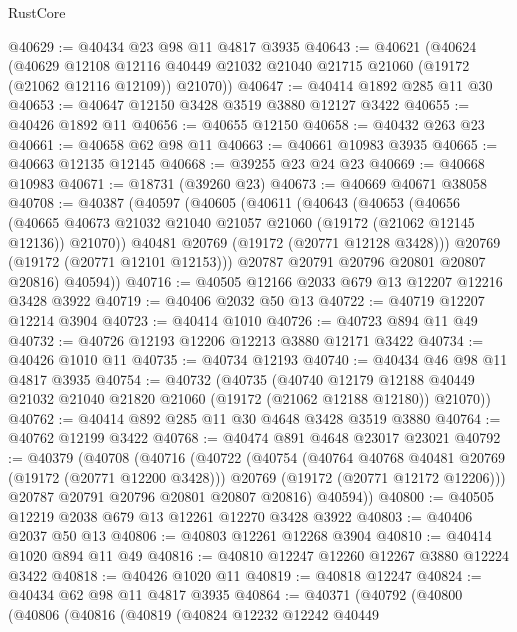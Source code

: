 \begin{lexlean}{RustCore}
\begin{coremodule}
@40629 := @40434 @23 @98 @11 @4817 @3935
@40643 := @40621
    (@40624
      (@40629
        @12108
        @12116
        @40449
        @21032
        @21040
        @21715
        @21060
        (@19172 (@21062 @12116 @12109))
        @21070))
@40647 := @40414 @1892 @285 @11 @30
@40653 := @40647 @12150 @3428 @3519 @3880 @12127 @3422
@40655 := @40426 @1892 @11
@40656 := @40655 @12150
@40658 := @40432 @263 @23
@40661 := @40658 @62 @98 @11
@40663 := @40661 @10983 @3935
@40665 := @40663 @12135 @12145
@40668 := @39255 @23 @24 @23
@40669 := @40668 @10983
@40671 := @18731 (@39260 @23)
@40673 := @40669 @40671 @38058
@40708 := @40387
    (@40597
      (@40605
        (@40611
          (@40643
            (@40653
              (@40656
                (@40665 @40673 @21032 @21040 @21057 @21060 (@19172 (@21062 @12145 @12136)) @21070))
              @40481
              @20769
              (@19172 (@20771 @12128 @3428)))
            @20769
            (@19172 (@20771 @12101 @12153)))
          @20787
          @20791
          @20796
          @20801
          @20807
          @20816)
        @40594))
@40716 := @40505 @12166 @2033 @679 @13 @12207 @12216 @3428 @3922
@40719 := @40406 @2032 @50 @13
@40722 := @40719 @12207 @12214 @3904
@40723 := @40414 @1010
@40726 := @40723 @894 @11 @49
@40732 := @40726 @12193 @12206 @12213 @3880 @12171 @3422
@40734 := @40426 @1010 @11
@40735 := @40734 @12193
@40740 := @40434 @46 @98 @11 @4817 @3935
@40754 := @40732
    (@40735
      (@40740
        @12179
        @12188
        @40449
        @21032
        @21040
        @21820
        @21060
        (@19172 (@21062 @12188 @12180))
        @21070))
@40762 := @40414 @892 @285 @11 @30 @4648 @3428 @3519 @3880
@40764 := @40762 @12199 @3422
@40768 := @40474 @891 @4648 @23017 @23021
@40792 := @40379
    (@40708
      (@40716
        (@40722
          (@40754
            (@40764 @40768 @40481 @20769 (@19172 (@20771 @12200 @3428)))
            @20769
            (@19172 (@20771 @12172 @12206)))
          @20787
          @20791
          @20796
          @20801
          @20807
          @20816)
        @40594))
@40800 := @40505 @12219 @2038 @679 @13 @12261 @12270 @3428 @3922
@40803 := @40406 @2037 @50 @13
@40806 := @40803 @12261 @12268 @3904
@40810 := @40414 @1020 @894 @11 @49
@40816 := @40810 @12247 @12260 @12267 @3880 @12224 @3422
@40818 := @40426 @1020 @11
@40819 := @40818 @12247
@40824 := @40434 @62 @98 @11 @4817 @3935
@40864 := @40371
    (@40792
      (@40800
        (@40806
          (@40816
            (@40819
              (@40824
                @12232
                @12242
                @40449

\end{coremodule}
\end{lexlean}
